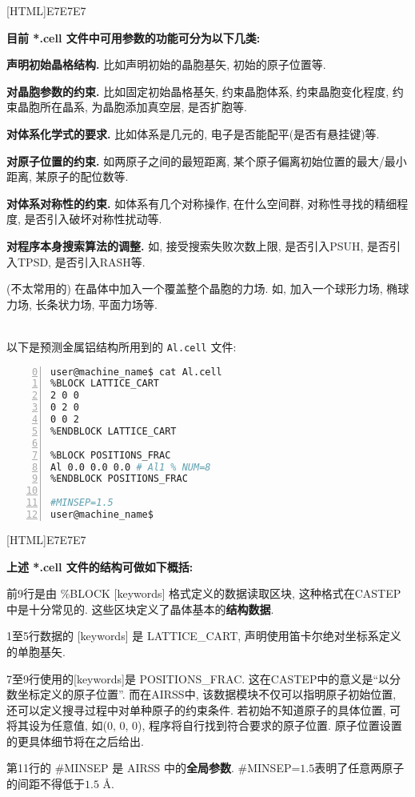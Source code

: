\documentclass[a4paper, 10pt]{article}
\begin{document}
\noindent{}[HTML]{E7E7E7}{\parbox{\textwidth}{%
\noindent \textbf{目前 *.cell 文件中可用参数的功能可分为以下几类:}
\begin{maineu}
  \item \textbf{声明初始晶格结构.} 比如声明初始的晶胞基矢, 初始的原子位置等.
  \item \textbf{对晶胞参数的约束.} 比如固定初始晶格基矢, 约束晶胞体系, 约束晶胞变化程度, 约束晶胞所在晶系, 为晶胞添加真空层, 是否扩胞等.
  \item \textbf{对体系化学式的要求.} 比如体系是几元的, 电子是否能配平(是否有悬挂键)等.
  \item \textbf{对原子位置的约束.} 如两原子之间的最短距离, 某个原子偏离初始位置的最大/最小距离, 某原子的配位数等. 
  \item \textbf{对体系对称性的约束.} 如体系有几个对称操作, 在什么空间群, 对称性寻找的精细程度, 是否引入破坏对称性扰动等.
  \item \textbf{对程序本身搜索算法的调整.} 如, 接受搜索失败次数上限, 是否引入PSUH, 是否引入TPSD, 是否引入RASH等.
  \item (不太常用的) 在晶体中加入一个覆盖整个晶胞的力场. 如, 加入一个球形力场, 椭球力场, 长条状力场, 平面力场等.
\end{maineu}}}\\

以下是预测金属铝结构所用到的 \verb|Al.cell| 文件:
\begin{lstlisting}[language={bash},numbers=left,firstnumber=0]
user@machine_name$ cat Al.cell
%BLOCK LATTICE_CART
2 0 0
0 2 0
0 0 2 
%ENDBLOCK LATTICE_CART

%BLOCK POSITIONS_FRAC
Al 0.0 0.0 0.0 # Al1 % NUM=8
%ENDBLOCK POSITIONS_FRAC

#MINSEP=1.5
user@machine_name$
\end{lstlisting}


\noindent{}[HTML]{E7E7E7}{\parbox{\textwidth}{%
\noindent \textbf{上述 *.cell 文件的结构可做如下概括:}
\begin{maineu}
  \item 前9行是由 \%BLOCK [keywords] 格式定义的数据读取区块, 这种格式在CASTEP中是十分常见的. 这些区块定义了晶体基本的\textbf{结构数据}.   
  \item 1至5行数据的 [keywords] 是 LATTICE\_CART, 声明使用笛卡尔绝对坐标系定义的单胞基矢. 
  \item 7至9行使用的[keywords]是 POSITIONS\_FRAC. 这在CASTEP中的意义是``以分数坐标定义的原子位置''. 而在AIRSS中, 该数据模块不仅可以指明原子初始位置, 还可以定义搜寻过程中对单种原子的约束条件. 若初始不知道原子的具体位置, 可将其设为任意值, 如(0, 0, 0), 程序将自行找到符合要求的原子位置. 原子位置设置的更具体细节将在之后给出. 
  \item 第11行的 \#MINSEP 是 AIRSS 中的\textbf{全局参数}.
  \#MINSEP=\(1.5\)表明了任意两原子的间距不得低于\(1.5\) \r{A}.
\end{maineu}}}\\
\end{document}
